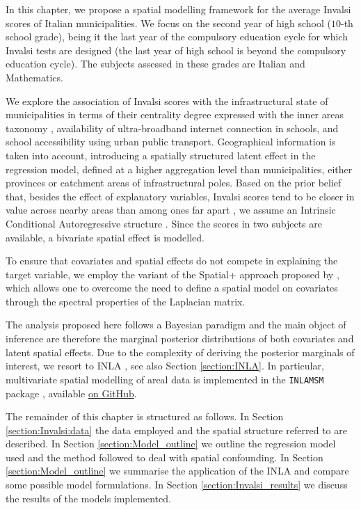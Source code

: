 \documentclass[openany, 11pt, oneside]{book}
\begin{document}
 In this chapter, we propose a spatial modelling framework for the average Invalsi scores of Italian municipalities. We focus on the second year of high school ($10$-th school grade), being it the last year of the compulsory education cycle for which Invalsi tests are designed (the last year of high school is beyond the compulsory education cycle). The subjects assessed in these grades are Italian and Mathematics.

We explore the association of Invalsi scores with the infrastructural state of municipalities in terms of their centrality degree expressed with the inner areas taxonomy \parencite{InnerAreas}, availability of ultra-broadband internet connection in schools, and school accessibility using urban public transport. Geographical information is taken into account, introducing a spatially structured latent effect in the regression model, defined at a higher aggregation level than municipalities, either provinces or catchment areas of infrastructural poles. Based on the prior belief that, besides the effect of explanatory variables, Invalsi scores tend to be closer in value across nearby areas than among ones far apart \parencite{CAR}, we assume an Intrinsic Conditional Autoregressive structure \parencite[ICAR, ][]{BYM, ICAR}. Since the scores in two subjects are available, a bivariate spatial effect is modelled.

To ensure that covariates and spatial effects do not compete in explaining the target variable, we employ the variant of the Spatial+ approach proposed by \cite{Urdangarin24}, which allows one to overcome the need to define a spatial model on covariates through the spectral properties of the Laplacian matrix.

The analysis proposed here follows a Bayesian paradigm and the main object of inference are therefore the marginal posterior distributions of both covariates and latent spatial effects. Due to the complexity of deriving the posterior marginals of interest, we resort to INLA \parencite{INLA, VBINLA2023}, see also Section \ref{section:INLA}. In particular, multivariate spatial modelling of areal data is implemented in the \texttt{INLAMSM} package \parencite{INLAMSM, INLAMSM2}, available \href{https://github.com/becarioprecario/INLAMSM}{on GitHub}.
 
The remainder of this chapter is structured as follows. In Section \ref{section:Invalsi:data} the data employed and the spatial structure referred to are described. In Section \ref{section:Model_outline} we outline the regression model used and the method followed to deal with spatial confounding. In Section \ref{section:Model_outline} we summarise the application of the INLA and compare some possible model formulations. In Section \ref{section:Invalsi_results} we discuss the results of the models implemented.
\end{document}
